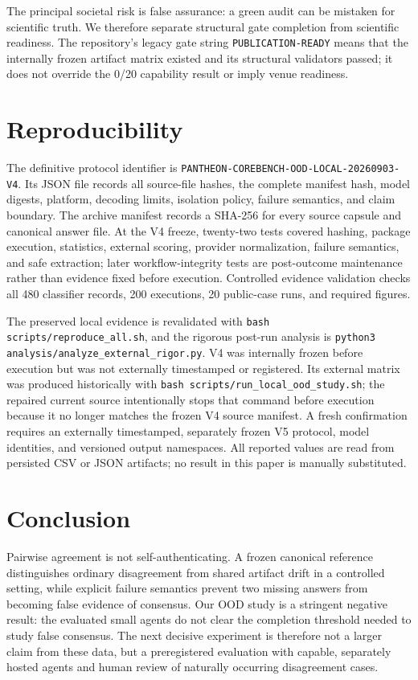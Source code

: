 \documentclass[10pt]{article}
\begin{document}
The principal societal risk is false assurance: a green audit can be mistaken for scientific truth. We therefore separate structural gate completion from scientific readiness. The repository's legacy gate string \texttt{PUBLICATION-READY} means that the internally frozen artifact matrix existed and its structural validators passed; it does not override the 0/20 capability result or imply venue readiness.

\section{Reproducibility}
The definitive protocol identifier is \texttt{PANTHEON-COREBENCH-OOD-LOCAL-20260903-V4}. Its JSON file records all source-file hashes, the complete manifest hash, model digests, platform, decoding limits, isolation policy, failure semantics, and claim boundary. The archive manifest records a SHA-256 for every source capsule and canonical answer file. At the V4 freeze, twenty-two tests covered hashing, package execution, statistics, external scoring, provider normalization, failure semantics, and safe extraction; later workflow-integrity tests are post-outcome maintenance rather than evidence fixed before execution. Controlled evidence validation checks all 480 classifier records, 200 executions, 20 public-case runs, and required figures.

The preserved local evidence is revalidated with \texttt{bash scripts/reproduce\_all.sh}, and the rigorous post-run analysis is \texttt{python3 analysis/analyze\_external\_rigor.py}. V4 was internally frozen before execution but was not externally timestamped or registered. Its external matrix was produced historically with \texttt{bash scripts/run\_local\_ood\_study.sh}; the repaired current source intentionally stops that command before execution because it no longer matches the frozen V4 source manifest. A fresh confirmation requires an externally timestamped, separately frozen V5 protocol, model identities, and versioned output namespaces. All reported values are read from persisted CSV or JSON artifacts; no result in this paper is manually substituted.

\section{Conclusion}
Pairwise agreement is not self-authenticating. A frozen canonical reference distinguishes ordinary disagreement from shared artifact drift in a controlled setting, while explicit failure semantics prevent two missing answers from becoming false evidence of consensus. Our OOD study is a stringent negative result: the evaluated small agents do not clear the completion threshold needed to study false consensus. The next decisive experiment is therefore not a larger claim from these data, but a preregistered evaluation with capable, separately hosted agents and human review of naturally occurring disagreement cases.
\end{document}
